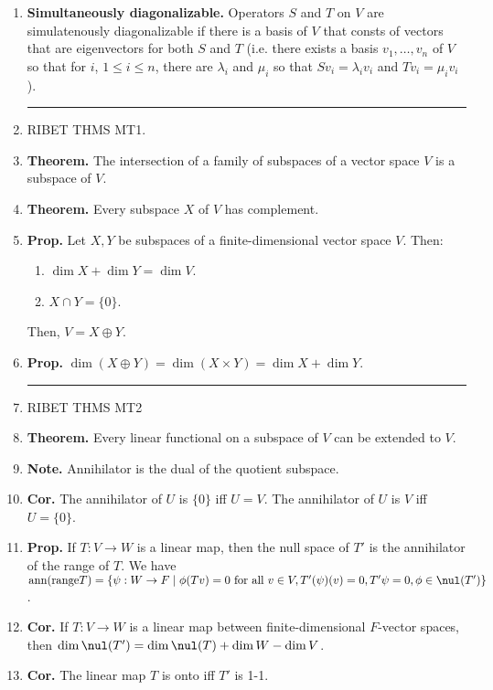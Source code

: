 \begin{enumerate}
	\item \textbf{Simultaneously diagonalizable. } Operators $S$ and $T$ on $V$ are simulatenously diagonalizable if there is a basis of $V$ that consts of vectors that are eigenvectors for both $S$ and $T$ (i.e. there exists a basis $v_1,\dots,v_n$ of $V$ so that for $i$, $1 \leq i \leq n$, there are $\lambda_i$ and $\mu_i$ so that $Sv_i = \lambda_iv_i$ and $Tv_i = \mu_iv_i$). 
	\begin{center}
		\hrule
	\end{center} 
	\item RIBET THMS MT1. 
    \item \textbf{Theorem. } The intersection of a family of subspaces of a vector space $V$ is a subspace of $V$. 
    \item \textbf{Theorem. } Every subspace $X$ of $V$ has complement. 
	\item \textbf{Prop. } Let $X,Y$ be subspaces of a finite-dimensional vector space $V$. Then: 
	\begin{enumerate}
		\item $\dim X + \dim Y = \dim V$. 
		\item $X \cap Y = \{0\}$. 
	\end{enumerate}
	Then, $V=X \oplus Y$. 
	\item \textbf{Prop. } $\dim(X \oplus Y) = \dim(X \times Y) = \dim X + \dim Y$. 
	\begin{center}
		\hrule
	\end{center}
	\item RIBET THMS MT2
	\item \textbf{Theorem. } Every linear functional on a subspace of $V$ can be extended to $V$. 
	\item \textbf{Note. } Annihilator is the dual of the quotient subspace. 
	\item \textbf{Cor. } The annihilator of $U$ is $\{0\}$ iff $U = V$. The annihilator of $U$ is $V$ iff $U = \{0\}$. 
	\item \textbf{Prop. } If $T: V \to W$ is a linear map, then the null space of $T'$ is the annihilator of the range of $T$. We have $\textrm{ann}(\textrm{range}T) = \{\psi: W \to F \mid \phi(Tv)=0 \textrm{ for all } v \in V, T'(\psi)(v)=0, T'\psi = 0, \phi \in \nul(T')\}$. 
	\item \textbf{Cor. } If $T: V \to W$ is a linear map between finite-dimensional $F$-vector spaces, then $\dim \nul(T') = \dim \nul(T) + \dim W - \dim V$. 
	\item \textbf{Cor. } The linear map $T$ is onto iff $T'$ is 1-1. 

\end{enumerate}
